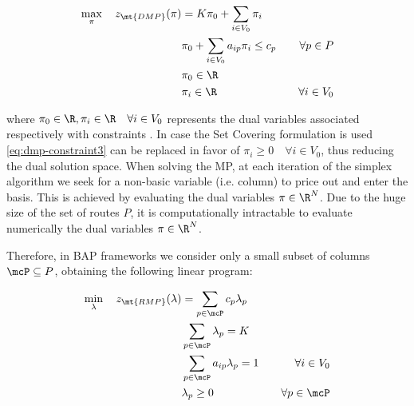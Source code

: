 \begin{align}
	\max_{\pi} \quad z_\mt{DMP}(\pi) & =  K \pi_0 + \sum_{i \in V_0} \pi_i \label{eq:dmp-obj-func}                                                    \\
	                                 & \pi_0 + \sum_{i \in V_0} a_{ip} \pi_i \le c_p               & \quad \forall p \in P \label{eq:dmp-constraint1} \\
	                                 & \pi_0 \in \R &  \label{eq:dmp-constraint2} \\
	                                 & \pi_i \in \R &  \quad \forall i \in V_0 \label{eq:dmp-constraint3}
\end{align}

where $\pi_0 \in \R, \pi_i \in \R \quad \forall i \in V_0$ represents the dual variables
associated respectively with constraints .
In case the Set Covering formulation is used \cref{eq:dmp-constraint3} can be replaced in favor of $\pi_i \ge 0 \quad \forall i \in V_0$,
thus reducing the dual solution space.
When solving the MP,
at each iteration of the simplex algorithm \parencite{dantzig1955} we seek for a non-basic variable (i.e. column)
to price out and enter the basis.
This is achieved by evaluating the dual variables $\pi \in \R^N$.
Due to the huge size of the set of routes $P$,
it is computationally intractable to evaluate numerically the dual variables $\pi \in \R^{N}$.

\medskip

Therefore, in BAP frameworks we consider only a small subset of columns $\mcP \subseteq P$,
obtaining the following linear program:

\begin{align}
	\min_{\lambda} \quad z_\mt{RMP}(\lambda) & = \sum_{p \in \mcP}  c_p \lambda_p \label{eq:rmp-obj-func}                                                                                                                              \\
	                                         & \sum_{p \in \mcP} \lambda_{p} = K\label{eq:rmp-K-routes}                                                                                                                                \\
	                                         & \sum_{p \in \mcP}  a_{ip} \lambda_p = 1                    & \quad \forall i \in V_0                                              \label{eq:rmp-customers-visited-by-exactly-one-route} \\
	                                         & \lambda_p \ge 0                                            & \quad \forall p \in \mcP \label{eq:rmp-lambda-mip-var-bounds}
\end{align}

